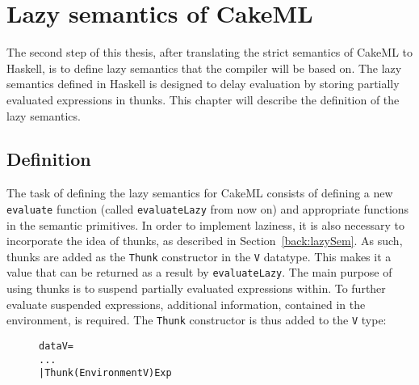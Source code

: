 \chapter{Lazy semantics of CakeML}
\label{lazySem}
The second step of this thesis, after translating the strict semantics of CakeML
to Haskell, is to define lazy semantics that the compiler will be based on.
The lazy semantics defined in Haskell is designed to delay evaluation by
storing partially evaluated expressions in thunks. This chapter will describe
the definition of the lazy semantics.

\section{Definition}
\label{lazySem:impl}

The task of defining the lazy semantics for CakeML consists of defining a new
\texttt{evaluate} function (called \texttt{evaluateLazy} from now on) and
appropriate functions in the semantic primitives.
In order to implement laziness, it is also necessary to incorporate the idea of
thunks, as described in Section~\ref{back:lazySem}. As such, thunks are added
as the \texttt{Thunk} constructor in the \texttt{V} datatype. This makes
it a value that can be returned as a result by
\texttt{evaluateLazy}. The main purpose of using thunks is to suspend partially
evaluated expressions within. To further evaluate suspended expressions,
additional information, contained in the environment, is required.
The \texttt{Thunk} constructor is thus added to the \texttt{V} type:

\begin{figure}[H]
\begin{alltt}
  data V =
    ...
    | Thunk (Environment V) Exp
\end{alltt}
\end{figure}

